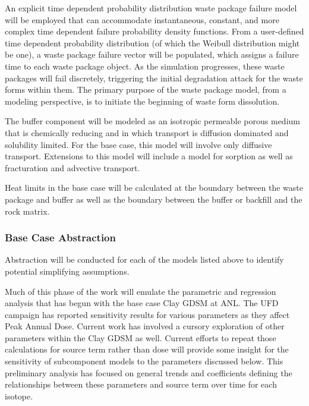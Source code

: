 
      
      An explicit time dependent probability distribution waste package failure 
      model will be employed that can accommodate instantaneous, constant, and 
      more complex time dependent failure probability density functions.
      From a user-defined time dependent probability distribution (of which the 
      Weibull distribution might be one), a waste package failure vector will be 
      populated, which assigns a failure time to each waste package object. As 
      the simulation progresses, these waste packages will fail discretely, 
      triggering the initial degradation attack for the waste forms within them. 
      The primary purpose of the waste package model, from a modeling 
      perspective, is to initiate the beginning of waste form dissolution.

      

      The buffer component will be modeled as an isotropic permeable porous 
      medium that is chemically reducing and in which transport is diffusion 
      dominated  and solubility limited.  For the base case, this model will 
      involve only diffusive transport. Extensions to this model will include a 
      model for sorption as well as fracturation and advective transport.  


      Heat limits in the base case will be calculated at the boundary between 
      the waste package and buffer as well as the boundary between the buffer or  
      backfill and the rock matrix.

\subsubsection{Base Case Abstraction }


  Abstraction will be conducted for each of the models listed above to identify  
  potential simplifying assumptions.  
  
  Much of this phase of the work will emulate the parametric and regression analysis that
has begun with the base case Clay \gls{GDSM} at \gls{ANL}.  
The \gls{UFD} campaign has reported sensitivity results for various 
parameters as they affect Peak Annual Dose. Current work has involved a cursory  
exploration of other parameters within the Clay \gls{GDSM} as well. Current 
efforts to repeat those calculations for source term rather than 
dose will provide some insight for the sensitivity of subcomponent models to the 
parameters discussed below. This preliminary analysis has focused on general 
trends and coefficients defining the relationships between these 
parameters and source term over time for each isotope. 

